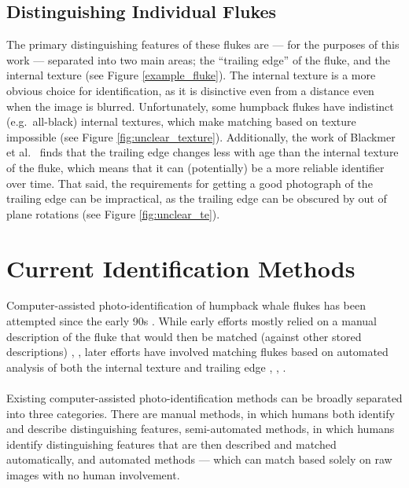 \subsection{Distinguishing Individual Flukes}

The primary distinguishing features of these flukes are --- for the purposes of this work --- separated into two main areas; the ``trailing edge'' of the fluke, and the internal texture (see Figure \ref{example_fluke}).
The internal texture is a more obvious choice for identification, as it is disinctive even from a distance even when the image is blurred.
Unfortunately, some humpback flukes have indistinct (e.g.\ all-black) internal textures, which make matching based on texture impossible (see Figure \ref{fig:unclear_texture}).
Additionally, the work of Blackmer et al.\ \cite{blackmer2000temporal} finds that the trailing edge changes less with age than the internal texture of the fluke, which means that it can (potentially) be a more reliable identifier over time.
That said, the requirements for getting a good photograph of the trailing edge can be impractical, as the trailing edge can be obscured by out of plane rotations (see Figure \ref{fig:unclear_te}).


\section{Current Identification Methods}

Computer-assisted photo-identification of humpback whale flukes has been attempted since the early 90s \cite{mizroch1990computer}.
While early efforts mostly relied on a manual description of the fluke that would then be matched (against other stored descriptions) \cite{mizroch1990computer}, \cite{whitehead1990computer}, later efforts have involved matching flukes based on automated analysis of both the internal texture and trailing edge \cite{hughes2015automated}, \cite{kniest2010fluke}, \cite{i3scontour}.
\\\\
Existing computer-assisted photo-identification methods can be broadly separated into three categories.
There are manual methods, in which humans both identify and describe distinguishing features, semi-automated methods, in which humans identify distinguishing features that are then described and matched automatically, and automated methods --- which can match based solely on raw images with no human involvement. 



